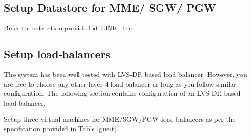 \pdfminorversion=4\documentclass[hidelinks]{report}
\begin{document}
\subsection*{Setup Datastore for MME/ SGW/ PGW}
Refer to instruction provided at LINK.
 \href{https://github.com/networkedsystemsIITB/NFV\_LTE\_EPC/blob/master/KeyValueStore/Docs/UserManual.pdf}{\color{blue}here}.


\subsection*{Setup load-balancers}
\label{sds}
The system has been well tested with LVS-DR based load balancer. However, you are free to choose any other layer-4 load-balancer as long as you follow similar configuration. The following section contains configuration of an LVS-DR based load balancer.

Setup three virtual machines for MME/SGW/PGW load balancers as per the specification provided in Table \ref{guest}.
\end{document}
